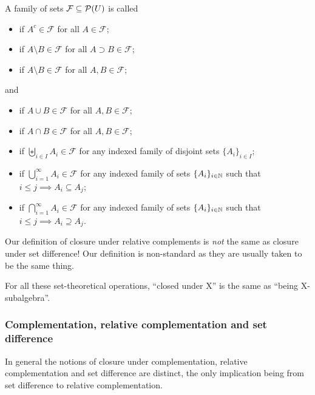 \begin{definition}
A family of sets $\mathcal{F}\subseteq\operatorname{\mathcal{P}}(U)$ is called
\begin{itemize}
\item {} if $A^c\in\mathcal{F}$ for all $A\in\mathcal{F}$;
\item {} if $A\setminus B\in\mathcal{F}$ for all $A \supset B\in\mathcal{F}$;
\item {} if $A\setminus B\in\mathcal{F}$ for all $A, B\in\mathcal{F}$;
\end{itemize}
and
\begin{itemize}
\item {} if $A\cup B \in\mathcal{F}$ for all $A,B\in\mathcal{F}$;
\item {} if $A\cap B \in\mathcal{F}$ for all $A,B\in\mathcal{F}$;
\item {} if $\biguplus_{i\in I}A_i \in\mathcal{F}$ for any indexed family of disjoint sets $\{A_i\}_{i\in I}$;
\item {} if $\bigcup_{i=1}^\infty A_i \in\mathcal{F}$ for any indexed family of sets $\{A_i\}_{i\in \mathbb{N}}$ such that $i\leq j \implies A_i \subseteq A_j$;
\item {} if $\bigcap_{i=1}^\infty A_i \in\mathcal{F}$ for any indexed family of sets $\{A_i\}_{i\in \mathbb{N}}$ such that $i\leq j \implies A_i \supseteq A_j$.
\end{itemize}
Our definition of closure under relative complements is \emph{not} the same as closure under set difference! Our definition is non-standard as they are usually taken to be the same thing.
\end{definition}

For all these set-theoretical operations, ``closed under X'' is the same as ``being X-subalgebra''.

\subsubsection{Complementation, relative complementation and set difference}
In general the notions of closure under complementation, relative complementation and set difference are distinct, the only implication being from set difference to relative complementation.

